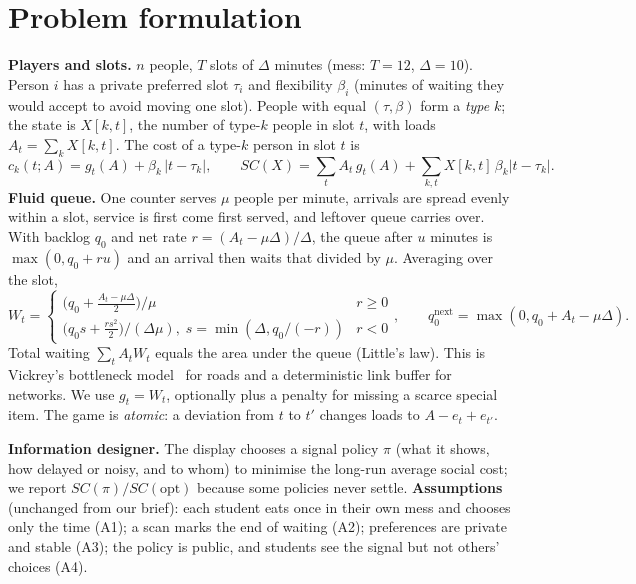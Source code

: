 \documentclass{article}
\begin{document}
\section{Problem formulation}
\textbf{Players and slots.} $n$ people, $T$ slots of $\Delta$ minutes (mess: $T{=}12$, $\Delta{=}10$). Person $i$
has a private preferred slot $\tau_i$ and flexibility $\beta_i$ (minutes of waiting they would accept to avoid
moving one slot). People with equal $(\tau,\beta)$ form a \emph{type} $k$; the state is $X[k,t]$, the number of
type-$k$ people in slot $t$, with loads $A_t=\sum_k X[k,t]$. The cost of a type-$k$ person in slot $t$ is
\begin{equation}
c_k(t;A)=g_t(A)+\beta_k\,|t-\tau_k|,\qquad SC(X)=\sum_t A_t\,g_t(A)+\sum_{k,t}X[k,t]\,\beta_k|t-\tau_k|.
\end{equation}
\textbf{Fluid queue.} One counter serves $\mu$ people per minute, arrivals are spread evenly within a slot,
service is first come first served, and leftover queue carries over. With backlog $q_0$ and net rate
$r=(A_t-\mu\Delta)/\Delta$, the queue after $u$ minutes is $\max(0,q_0+ru)$ and an arrival then waits that divided
by $\mu$. Averaging over the slot,
\begin{equation}
W_t=\begin{cases}\big(q_0+\tfrac{A_t-\mu\Delta}{2}\big)/\mu & r\ge0\\[2pt]
\big(q_0 s+\tfrac{r s^2}{2}\big)/(\Delta\mu),\; s=\min(\Delta,q_0/(-r)) & r<0\end{cases},\qquad q_0^{\text{next}}=\max(0,q_0+A_t-\mu\Delta).
\end{equation}
Total waiting $\sum_tA_tW_t$ equals the area under the queue (Little's law). This is Vickrey's bottleneck
model~\cite{vickrey} for roads and a deterministic link buffer for networks. We use $g_t=W_t$, optionally plus a
penalty for missing a scarce special item. The game is \emph{atomic}: a deviation from $t$ to $t'$ changes loads to
$A-e_t+e_{t'}$.

\textbf{Information designer.} The display chooses a signal policy $\pi$ (what it shows, how delayed or noisy, and
to whom) to minimise the long-run average social cost; we report $SC(\pi)/SC(\text{opt})$ because some policies
never settle. \textbf{Assumptions} (unchanged from our brief): each student eats once in their own mess and chooses
only the time (A1); a scan marks the end of waiting (A2); preferences are private and stable (A3); the policy is
public, and students see the signal but not others' choices (A4).
\end{document}
